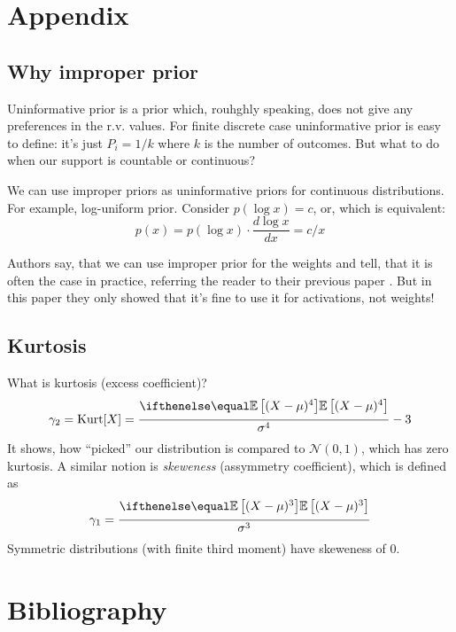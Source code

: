 \documentclass{article}
\begin{document}
\section{Appendix}
\subsection*{Why improper prior}
Uninformative prior is a prior which, rouhghly speaking, does not give any preferences in the r.v. values.
For finite discrete case uninformative prior is easy to define: it's just $P_i = 1/k$ where $k$ is the number of outcomes.
But what to do when our support is countable or continuous?

We can use improper priors as uninformative priors for continuous distributions.
For example, log-uniform prior.
Consider $p(\log x) = c$, or, which is equivalent:
\[
p(x) = p(\log x) \cdot \frac{d\log x}{dx} = c / x
\]

Authors say, that we can use improper prior for the weights and tell, that it is often the case in practice, referring the reader to their previous paper \cite{Information_Dropout}.
But in this paper they only showed that it's fine to use it for activations, not weights!

\subsection*{Kurtosis}
What is kurtosis (excess coefficient)?
\[
\gamma_2 = \text{Kurt}[X] = \frac{\expect{(X - \mu)^4}}{\sigma^4} - 3
\]
It shows, how ``picked'' our distribution is compared to $\mathcal{N}(0,1)$, which has zero kurtosis.
A similar notion is \textit{skeweness} (assymmetry coefficient), which is defined as
\[
\gamma_1 = \frac{\expect{(X - \mu)^3}}{\sigma^3}
\]
Symmetric distributions (with finite third moment) have skeweness of 0.


\section{Bibliography}
\printbibliography
\end{document}
